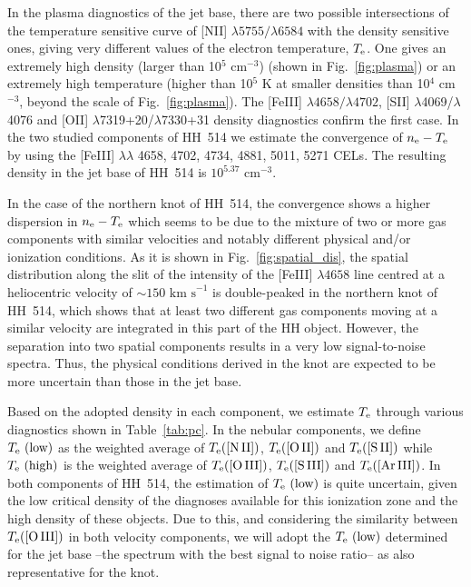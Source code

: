 \documentclass[fleqn,usenatbib]{mnras}
\begin{document}
In the plasma diagnostics of the jet base, there are two possible intersections of the temperature sensitive curve of [N\thinspace II] $\lambda5755/\lambda6584$ with the density sensitive ones, giving very different values of the electron temperature,  $T_{\rm e}$. One gives an extremely high density (larger than 10$^5$ cm$^{-3}$) (shown in Fig.~\ref{fig:plasma}) or an extremely high temperature (higher than 10$^{5}$ K at smaller densities than 10$^{4}$ cm$^{-3}$, beyond the scale of Fig.~\ref{fig:plasma}). The [Fe\thinspace III] $\lambda4658/\lambda4702$, [S\thinspace II] $\lambda$4069/$\lambda$4076 and [O\thinspace II] $\lambda$7319+20/$\lambda$7330+31 density diagnostics confirm the first case. In the two studied components of HH~514 we estimate the convergence of $n_{\rm e}-T_{\rm e}$ by using the [Fe\thinspace III] $\lambda \lambda$ 4658, 4702, 4734, 4881, 5011, 5271 CELs. The resulting density in the jet base of HH~514 is $10^{5.37} \text{ cm}^{-3}$. 

In the case of the northern knot of HH~514, the convergence shows a higher dispersion in $n_{\rm e}-T_{\rm e}$ which seems to be due to the mixture of two or more gas components with similar velocities and notably different physical and/or ionization conditions. As it is shown in Fig.~\ref{fig:spatial_dis}, the spatial distribution along the slit of the intensity of the  [Fe\thinspace III] $\lambda 4658$ line centred at a heliocentric velocity of $\sim 150 \text{ km s}^{-1}$ is double-peaked in the northern knot of HH~514, which shows that at least two different gas components moving at a similar velocity are integrated in this part of the HH object. However, the separation into two spatial components results in a very low signal-to-noise spectra. Thus, the physical conditions derived in the knot are expected to be more uncertain than those in the jet base.

Based on the adopted density in each component, we estimate $T_{\rm e}$ through various diagnostics shown in Table~\ref{tab:pc}. In the nebular components, we define $T_{\rm e} \text{ (low)}$ as the weighted average of $T_{\rm e} (\text{[N\thinspace II]})$, $T_{\rm e} (\text{[O\thinspace II]})$ and $T_{\rm e} (\text{[S\thinspace II]})$ while $T_{\rm e} \text{ (high)}$ is the weighted average of $T_{\rm e} (\text{[O\thinspace III]})$, $T_{\rm e} (\text{[S\thinspace III]})$ and $T_{\rm e} (\text{[Ar\thinspace III]})$. In both components of HH~514, the estimation of $T_{\rm e} \text{ (low)}$ is quite uncertain, given the low critical density of the diagnoses available for this ionization zone and the high density of these objects. Due to this, and considering the similarity between $T_{\rm e}(\text{[O\thinspace III]})$ in both velocity components, we will adopt the $T_{\rm e} \text{ (low)}$ determined for the jet base --the spectrum with the best signal to noise ratio-- as also representative for the knot.
\end{document}
